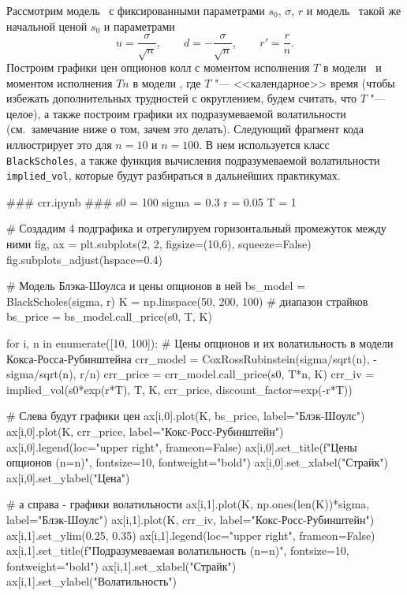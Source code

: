 Рассмотрим модель \bs\ с фиксированными параметрами $s_0$, $\sigma$, $r$ и модель \crr\ такой же начальной ценой $s_0$ и параметрами
\[
u = \frac{\sigma}{\sqrt n}, \qquad d = -\frac{\sigma}{\sqrt n}, \qquad r' = \frac{r}{n}.
\]
Построим графики цен опционов колл с моментом исполнения $T$ в модели \bs\ и моментом исполнения $Tn$ в модели \crr, где $T$ "--- <<календарное>> время (чтобы избежать дополнительных трудностей с округлением, будем считать, что $T$ "--- целое), а также построим графики их подразумеваемой волатильности (см.~замечание ниже о том, зачем это делать).
Следующий фрагмент кода иллюстрирует это для $n=10$ и $n=100$.
В нем используется класс \verb"BlackScholes", а также функция вычисления подразумеваемой волатильности \verb"implied_vol", которые будут разбираться в дальнейших практикумах.
\begin{python}
### crr.ipynb ###
s0 = 100
sigma = 0.3
r = 0.05
T = 1

# Создадим 4 подграфика и отрегулируем горизонтальный промежуток между ними
fig, ax = plt.subplots(2, 2, figsize=(10,6), squeeze=False)
fig.subplots_adjust(hspace=0.4)

# Модель Блэка-Шоулса и цены опционов в ней
bs_model = BlackScholes(sigma, r)
K = np.linspace(50, 200, 100) # диапазон страйков
bs_price = bs_model.call_price(s0, T, K)

for i, n in enumerate([10, 100]):
    # Цены опционов и их волатильность в модели Кокса-Росса-Рубинштейна
    crr_model = CoxRossRubinstein(sigma/sqrt(n), -sigma/sqrt(n), r/n)
    crr_price = crr_model.call_price(s0, T*n, K)
    crr_iv = implied_vol(s0*exp(r*T), T, K, crr_price, discount_factor=exp(-r*T))

    # Слева будут графики цен
    ax[i,0].plot(K, bs_price, label="Блэк-Шоулс")
    ax[i,0].plot(K, crr_price, label="Кокс-Росс-Рубинштейн")
    ax[i,0].legend(loc="upper right", frameon=False)
    ax[i,0].set_title(f"Цены опционов (n={n})", fontsize=10, fontweight="bold")
    ax[i,0].set_xlabel("Страйк")
    ax[i,0].set_ylabel("Цена")

    # а справа - графики волатильности
    ax[i,1].plot(K, np.ones(len(K))*sigma, label="Блэк-Шоулс")
    ax[i,1].plot(K, crr_iv, label="Кокс-Росс-Рубинштейн")
    ax[i,1].set_ylim(0.25, 0.35)
    ax[i,1].legend(loc="upper right", frameon=False)
    ax[i,1].set_title(f"Подразумеваемая волатильность (n={n})", fontsize=10,
    fontweight="bold")
    ax[i,1].set_xlabel("Страйк")
    ax[i,1].set_ylabel("Волатильность")
\end{python}

